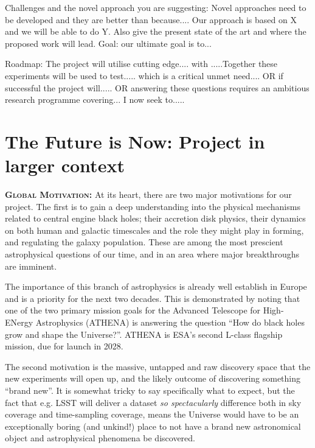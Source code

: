 \documentclass[oneside, a4paper, onecolumn, 11pt]{article}
\begin{document}
\smallskip
\smallskip
\noindent
Challenges and the novel approach you are suggesting: Novel approaches
need to be developed and they are better than because.... Our approach
is based on X and we will be able to do Y. Also give the present state
of the art and where the proposed work will lead.
Goal: our ultimate goal is to...

\smallskip
\smallskip
\noindent
Roadmap: The project will utilise cutting edge.... with .....Together
these experiments will be used to test..... which is a critical unmet
need.... OR if successful the project will..... OR answering these
questions requires an ambitious research programme covering... I now
seek to.....


\section{\textcolor{Cerulean}{The Future is Now: Project in larger context}}
\textbf{\textsc{\textcolor{Cerulean}{Global Motivation:}}}
At its heart, there are two major motivations for our project. 
The first is to gain a deep understanding into the physical mechanisms 
related to central engine black holes; their accretion disk physics, their 
dynamics on both human and galactic timescales and the role they might 
play in forming, and regulating the galaxy population. These are among the 
most prescient astrophysical questions of our time, and in an area where 
major breakthroughs are imminent. 

\smallskip
\smallskip
\noindent
The importance of this branch of astrophysics is already well establish in 
Europe and is a priority for the next two decades. This is demonstrated by noting that
one of the two primary mission goals for the Advanced Telescope for High-ENergy Astrophysics (ATHENA) is 
answering the question ``How do black holes grow and shape the Universe?''. 
ATHENA is ESA's second L-class flagship mission, due for launch in 2028.

\smallskip
\smallskip
\noindent
The second motivation is the massive, untapped and raw discovery space 
that the new experiments will open up, and the likely outcome of discovering 
something ``brand new''. It is somewhat tricky to say specifically what to 
expect, but the fact that e.g. LSST will deliver a dataset {\it so spectacularly} 
difference both in sky coverage and time-sampling coverage, means the 
Universe would have to be an exceptionally boring (and unkind!) place to 
not have a brand new astronomical object and astrophysical phenomena 
be discovered. 
\end{document}
